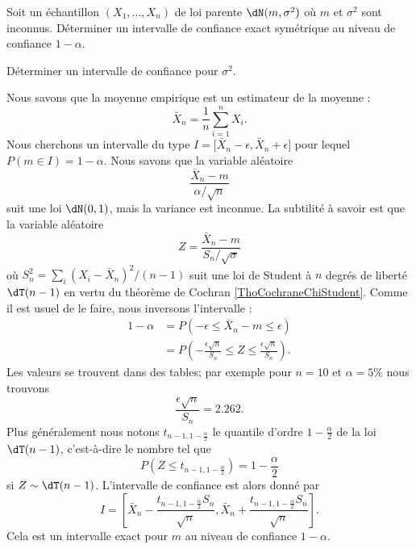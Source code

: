 \begin{example}

	Soit un échantillon \( (X_1,\ldots,X_n)\) de loi parente \( \dN(m,\sigma^2)\) où \( m\) et \( \sigma^2\) sont inconnus. Déterminer un intervalle de confiance exact symétrique au niveau de confiance \( 1-\alpha\).

	Déterminer un intervalle de confiance pour \( \sigma^2\).

	Nous savons que la moyenne empirique est un estimateur de la moyenne :
	\begin{equation}
		\bar X_n=\frac{1}{ n }\sum_{i=1}^nX_i.
	\end{equation}
	Nous cherchons un intervalle du type \( I=\mathopen[ \bar X_n-\epsilon , \bar X_n+\epsilon \mathclose]\) pour lequel \( P(m\in I)=1-\alpha\). Nous savons que la variable aléatoire
	\begin{equation}
		\frac{ \bar X_n-m }{ \alpha/\sqrt{n} }
	\end{equation}
	suit une loi \( \dN(0,1)\), mais la variance est inconnue. La subtilité à savoir est que la variable aléatoire
	\begin{equation}
		Z=\frac{ \bar X_n-m }{ S_n/\sqrt{\sigma} }
	\end{equation}
	où \( S_n^2=\sum_i(X_i-\bar X_n)^2/(n-1)\) suit une loi de Student à \( n\) degrés de liberté \( \dT(n-1)\) en vertu du théorème de Cochran \ref{ThoCochraneChiStudent}. Comme il est usuel de le faire, nous inversons l'intervalle :
	\begin{subequations}
		\begin{align}
			1-\alpha & =P\left( -\epsilon\leq \bar X_n-m\leq \epsilon \right)                                         \\
			         & =P\left( -\frac{ \epsilon\sqrt{n} }{ S_n }\leq Z\leq \frac{ \epsilon\sqrt{n} }{ S_n } \right).
		\end{align}
	\end{subequations}
	Les valeurs se trouvent dans des tables; par exemple pour \( n=10\) et \( \alpha=5\%\) nous trouvons
	\begin{equation}
		\frac{ \epsilon\sqrt{n} }{ S_n }=2.262.
	\end{equation}
	Plus généralement nous notons \( t_{n-1,1-\frac{ \alpha }{2}}\) le quantile d'ordre \( 1-\frac{ \alpha }{2}\) de la loi \( \dT(n-1)\), c'est-à-dire le nombre tel que
	\begin{equation}
		P(Z\leq t_{n-1,1-\frac{ \alpha }{2}})=1-\frac{ \alpha }{2}
	\end{equation}
	si \( Z\sim\dT(n-1)\). L'intervalle de confiance est alors donné par
	\begin{equation}
		I=\left[ \bar X_n-\frac{ t_{n-1,1-\frac{ \alpha }{2}}S_n }{ \sqrt{n} },\bar X_n+\frac{ t_{n-1,1-\frac{ \alpha }{2}}S_n }{ \sqrt{n} } \right].
	\end{equation}
	Cela est un intervalle exact pour \( m\) au niveau de confiance \( 1-\alpha\).


\end{example}
